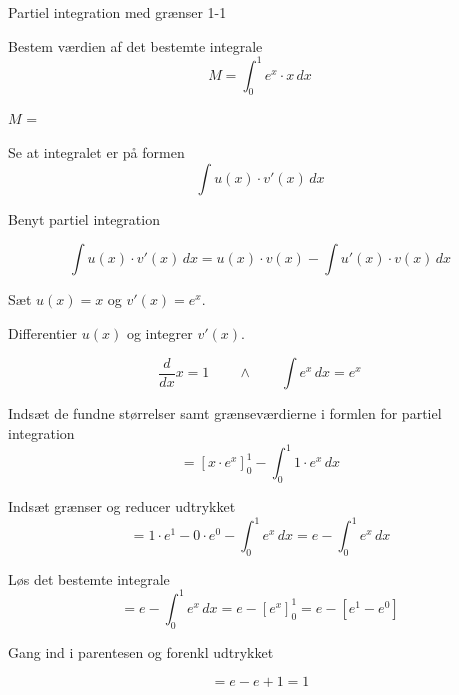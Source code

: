\documentclass{article}
\begin{document}
\tableofcontents

\newpage

\begin{exercise}{Partiel integration med grænser 1-1}


Bestem værdien af det bestemte integrale
\[
M = \int_0^1 e^x \cdot x \, dx
\]

$M$ = 


\hint

Se at integralet er på formen
\[
\int u(x) \cdot v'(x) \, dx
\]

\hint

Benyt partiel integration

\hint
\[
\int u(x) \cdot v'(x)\, dx = u(x) \cdot v(x) - \int u'(x) \cdot v(x) \, dx
\]
\hint

Sæt $u(x) = x$ og $v'(x) = e^x$.


\hint

Differentier $u(x)$ og integrer $v'(x)$.

\hint
\[
\frac{d}{dx}x = 1 \qquad \wedge \qquad \int e^x \, dx = e^x
\]

\hint

Indsæt de fundne størrelser samt grænseværdierne i formlen for partiel integration
\[
= \left[x \cdot e^x\right]_{0}^{1} - \int_{0}^{1} 1 \cdot e^x \, dx
\]

\hint

Indsæt grænser og reducer udtrykket
\[
= 1 \cdot e^1 - 0 \cdot e^0 - \int_{0}^{1} e^x \, dx = e - \int_{0}^{1} e^x \, dx
\]

\hint
Løs det bestemte integrale
\[
= e - \int_{0}^{1} e^x \, dx = e - \left[ e^x \right]_{0}^{1} = e - \left[ e^1 - e^0 \right]
\]

\hint
Gang ind i parentesen og forenkl udtrykket

\hint
\[
= e - e +1 = 1
\]



\end{exercise}

\newpage
\end{document}
